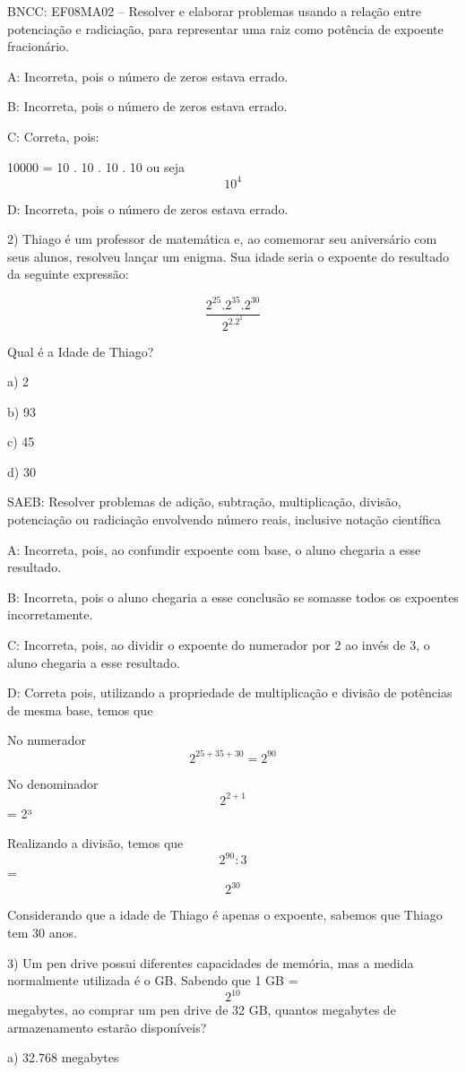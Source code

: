 BNCC: EF08MA02 -- Resolver e elaborar problemas usando a relação entre
potenciação e radiciação, para representar uma raiz como potência de
expoente fracionário.

A: Incorreta, pois o número de zeros estava errado.

B: Incorreta, pois o número de zeros estava errado.

C: Correta, pois:

10000 = 10 . 10 . 10 . 10 ou seja \[10^4\]

D: Incorreta, pois o número de zeros estava errado.

2) Thiago é um professor de matemática e, ao comemorar seu aniversário
com seus alunos, resolveu lançar um enigma. Sua idade seria o expoente
do resultado da seguinte expressão:

\[\frac {2^{25}. 2^{35}. 2^{30}} {2^2.2^1}\]

Qual é a Idade de Thiago?

a) 2

b) 93

c) 45

d) 30

SAEB: Resolver problemas de adição, subtração, multiplicação, divisão,
potenciação ou radiciação envolvendo número reais, inclusive notação
científica

A: Incorreta, pois, ao confundir expoente com base, o aluno chegaria a
esse resultado.

B: Incorreta, pois o aluno chegaria a esse conclusão se somasse todos os
expoentes incorretamente.

C: Incorreta, pois, ao dividir o expoente do numerador por 2 ao invés de
3, o aluno chegaria a esse resultado.

D: Correta pois, utilizando a propriedade de multiplicação e divisão de
potências de mesma base, temos que

No numerador \[2^{25+35+30}=2^{90}\]

No denominador \[2^{2+1}\] = 2³

Realizando a divisão, temos que \[2^{90}:3\] = \[2^{30}\]

Considerando que a idade de Thiago é apenas o expoente, sabemos que
Thiago tem 30 anos.

3) Um pen drive possui diferentes capacidades de memória, mas a medida
normalmente utilizada é o GB. Sabendo que 1 GB = \[2^{10}\] megabytes,
ao comprar um pen drive de 32 GB, quantos megabytes de armazenamento
estarão disponíveis?

a) 32.768 megabytes

